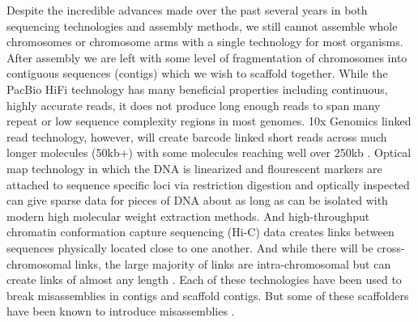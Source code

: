 \par{
Despite the incredible advances made over the past several years in both sequencing technologies and assembly methods, we still cannot assemble whole chromosomes or chromosome arms with a 
single technology for most organisms. After assembly we are left with some level of fragmentation of chromosomes into contiguous sequences (contigs) which we wish to scaffold together. While the 
PacBio HiFi technology has many beneficial properties including continuous, highly accurate reads, it does not produce long enough reads to span many repeat or low sequence complexity regions in most genomes.
 10x Genomics linked read technology, however, will create barcode linked short reads across much longer molecules (50kb+) with some molecules reaching well over 250kb \cite{10xlinked}. Optical map technology in which the DNA is linearized and flourescent markers are attached to sequence specific loci via restriction digestion and optically inspected can give sparse data for pieces of DNA about as long as can be isolated with modern high molecular weight extraction methods\cite{opticalmaps1}. And high-throughput chromatin conformation capture sequencing (Hi-C) data creates links between sequences physically located close to one another. And while there will be cross-chromosomal links, the large majority of links are intra-chromosomal but can create links of almost any length \cite{3CHIC} \cite{hic2}. Each of these technologies have been used to break misassemblies in contigs and scaffold contigs\cite{scaff10x}\cite{opticalmaphuman}\cite{hicscafffirst}\cite{SALSA}\cite{GRAAL}\cite{instaGRAAL}. But some of these scaffolders have been known to introduce misassemblies \cite{hicscafffirst}. 
} 


